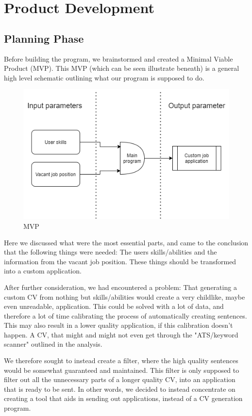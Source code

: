 \section{Product Development}\label{sec:product_development}
\subsection{Planning Phase}
Before building the program, we brainstormed and created a Minimal Viable Product (MVP).
This MVP (which can be seen illustrate beneath) is a general high level schematic outlining what our program is supposed to do.

\begin{figure}[H]
  \centering
  \includegraphics[scale = 0.6]{figures/engMVP}
  \caption{MVP}
\end{figure}
Here we discussed what were the most essential parts, and came to the conclusion that the following things
were needed: The users skills/abilities and the information from the vacant job position. These things
should be transformed into a custom application. 

After further consideration, we had encountered a problem: That generating a custom CV from nothing but
skills/abilities would create a very childlike, maybe even unreadable, application. This could be solved with a lot
of data, and therefore a lot of time calibrating the process of automatically creating sentences. This may also result
in a lower quality application, if this calibration doesn't happen. 
A CV, that might and might not even get through the "ATS/keyword scanner" outlined in the analysis. 

We therefore sought to instead create a filter, where the high quality sentences would be somewhat guaranteed and maintained.
This filter is only supposed to filter out all the unnecessary parts of a longer quality CV, into an application that
is ready to be sent. In other words, we decided to instead concentrate on creating a tool that aids
in sending out applications, instead of a CV generation program.

